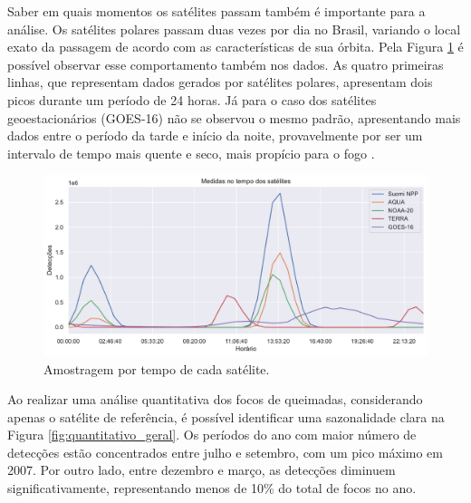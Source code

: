 \documentclass[cic,tc]{iiufrgs}
\begin{document}
Saber em quais momentos os satélites passam também é importante para a análise. Os satélites polares passam duas vezes por dia no Brasil, variando o local exato da passagem de acordo com as características de sua órbita. Pela Figura \ref{fig:tempo_medidas_satelites} é possível observar esse comportamento também nos dados. As quatro primeiras linhas, que representam dados gerados por satélites polares, apresentam dois picos durante um período de 24 horas. Já para o caso dos satélites geoestacionários (GOES-16) não se observou o mesmo padrão, apresentando mais dados entre o período da tarde e início da noite, provavelmente por ser um intervalo de tempo mais quente e seco, mais propício para o fogo \citep{nepstad2007mortality}.

\begin{figure}[H]
    \caption{Amostragem por tempo de cada satélite.}
    \begin{center}
        \includegraphics[width=35em]{tempo_medidas_satelites}
    \end{center}
    \label{fig:tempo_medidas_satelites}
\end{figure}

Ao realizar uma análise quantitativa dos focos de queimadas, considerando apenas o satélite de referência, é possível identificar uma sazonalidade clara na Figura \ref{fig:quantitativo_geral}. Os períodos do ano com maior número de detecções estão concentrados entre julho e setembro, com um pico máximo em 2007. Por outro lado, entre dezembro e março, as detecções diminuem significativamente, representando menos de 10\% do total de focos no ano.
\end{document}
